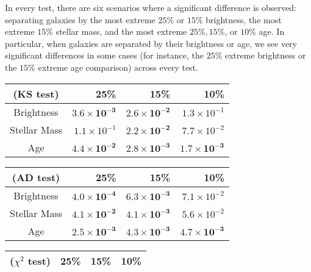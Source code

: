 \documentclass[usenatbib,useAMS]{mnras}
\theoremstyle{remark}
\begin{document}
{{{{{In every test, there are six scenarios where
a significant difference is observed:
separating galaxies by the most extreme $25\%$ or $15\%$ brightness, 
the most extreme $15\%$ stellar mass, 
and the most extreme $25\%, 15\%$, or $10\%$ age. 
In particular, when galaxies are separated by their brightness
or age,
we see very significant differences in some cases (for instance, the $25\%$ extreme brightness 
or the $15\%$ extreme age comparison) across every test. 




\begin{table}
\centering
\begin{tabular}{crrr}
  \hline
(KS test) & 25\% & 15\% & 10\% \\ 
  \hline
Brightness & $\mathbf{3.6\times 10^{-3}}$ & $\mathbf{2.6\times 10^{-2}}$  & ${1.3\times 10^{-1}}$  \\ 
Stellar Mass & $1.1\times 10^{-1}$  & $\mathbf{2.2\times10^{-2}}$  & $7.7\times10^{-2}$  \\ 
Age & $\mathbf{4.4\times10^{-2}}$  & $\mathbf{2.8\times10^{-3}}$  & $\mathbf{1.7\times10^{-3}}$  \\ 
   \hline
\end{tabular}
\begin{tabular}{crrr}
  \hline
(AD test) & 25\% & 15\% & 10\% \\ 
  \hline
Brightness & $\mathbf{4.0\times 10^{-4}}$ & $\mathbf{6.3\times 10^{-3}}$  & ${7.1\times 10^{-2}}$  \\ 
Stellar Mass & $\mathbf{4.1\times 10^{-2}}$  & $\mathbf{4.1\times10^{-3}}$  & $5.6\times10^{-2}$  \\ 
Age & $\mathbf{2.5\times10^{-3}}$  & $\mathbf{4.3\times10^{-3}}$  & $\mathbf{4.7\times10^{-3}}$  \\ 
   \hline
\end{tabular}
\begin{tabular}{crrr}
  \hline
($\chi^2$ test) & 25\% & 15\% & 10\% \\ 
  \hline

\end{tabular}
\end{table}}}}}}
\end{document}
